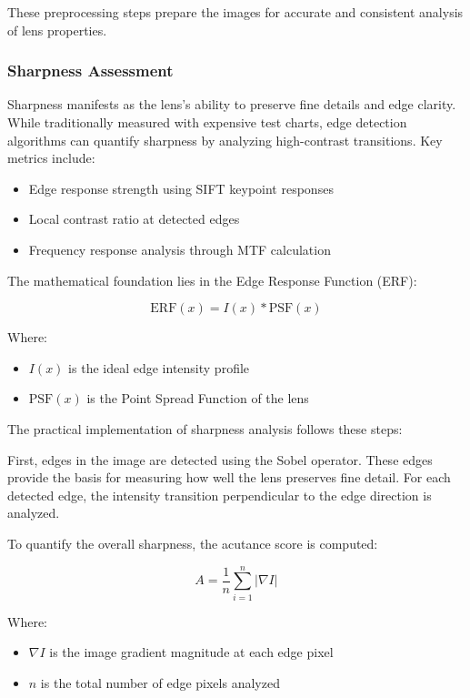 These preprocessing steps prepare the images for accurate and consistent analysis of lens properties.

\subsubsection{Sharpness Assessment}
Sharpness manifests as the lens's ability to preserve fine details and edge clarity. While traditionally measured with expensive test charts, edge detection algorithms can quantify sharpness by analyzing high-contrast transitions. Key metrics include:

\begin{itemize}
    \item Edge response strength using SIFT keypoint responses
    \item Local contrast ratio at detected edges
    \item Frequency response analysis through MTF calculation
\end{itemize}

The mathematical foundation lies in the Edge Response Function (ERF):

\begin{equation}
\text{ERF}(x) = I(x) * \text{PSF}(x)
\end{equation}

Where:
\begin{itemize}
    \item \( I(x) \) is the ideal edge intensity profile
    \item \( \text{PSF}(x) \) is the Point Spread Function of the lens
\end{itemize}

The practical implementation of sharpness analysis follows these steps:

First, edges in the image are detected using the Sobel operator. These edges provide the basis for measuring how well the lens preserves fine detail. For each detected edge, the intensity transition perpendicular to the edge direction is analyzed.

To quantify the overall sharpness, the acutance score is computed:

\begin{equation}
A = \frac{1}{n} \sum_{i=1}^{n} |\nabla I|
\end{equation}

Where:
\begin{itemize}
    \item \( \nabla I \) is the image gradient magnitude at each edge pixel
    \item \( n \) is the total number of edge pixels analyzed
\end{itemize}

